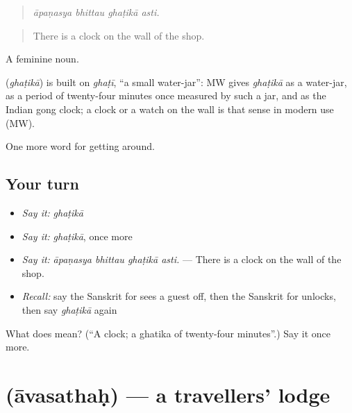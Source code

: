 \begin{quote}
   
\end{quote}

\begin{quote}
\emph{āpaṇasya bhittau ghaṭikā asti.}
\end{quote}

\begin{quote}
There is a clock on the wall of the shop.
\end{quote}

A feminine noun.

\begin{cousinweb}
\textbf{} (\emph{ghaṭikā}) is built on \emph{ghaṭī}, \textquotedblleft{}a small water-jar\textquotedblright{}: MW gives \emph{ghaṭikā} as a water-jar, as a period of twenty-four minutes once measured by such a jar, and as the Indian gong clock; a clock or a watch on the wall is that sense in modern use (MW).
\end{cousinweb}

\begin{grammarlens}[title={What you've built}]
One more word for getting around.
\end{grammarlens}

\subsection*{Your turn}
\begin{itemize}
\raggedright
  \item \emph{Say it:} \emph{ghaṭikā}
  \item \emph{Say it:} \emph{ghaṭikā}, once more
  \item \emph{Say it:} \emph{āpaṇasya bhittau ghaṭikā asti.} — There is a clock on the wall of the shop.
  \item \emph{Recall:} say the Sanskrit for sees a guest off, then the Sanskrit for unlocks, then say \emph{ghaṭikā} again
\end{itemize}

\begin{tcolorbox}[breakable,colback=teal!4,colframe=teal!35!black,title={Before you move on}]
What does  mean? (\textquotedblleft{}A clock; a ghatika of twenty-four minutes\textquotedblright{}.) Say it once more.
\end{tcolorbox}
\section[\texorpdfstring{\sk{आवसथः} (āvasathaḥ)}{आवसथः (āvasathaḥ)}]{ (āvasathaḥ) — a travellers' lodge}

